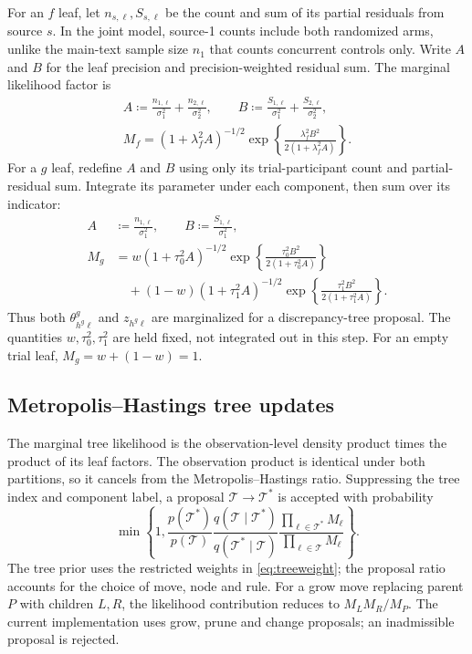\documentclass[11pt]{article}
\theoremstyle{remark}\newtheorem{remark}{Remark}[section]
\providecommand{\DIFaddtex}[1]{{\protect\color{blue} \sf #1}} %
\providecommand{\DIFaddbegin}{} %
\providecommand{\DIFaddend}{} %
\providecommand{\DIFadd}[1]{\texorpdfstring{\DIFaddtex{#1}}{#1}} %
\begin{document}
For an $f$ leaf, let $n_{s,\ell},S_{s,\ell}$ be the count and sum of its partial residuals from source $s$. \DIFaddbegin \DIFadd{In the joint model, source-1 counts include both randomized arms, unlike the main-text sample size $n_1$ that counts concurrent controls only. }\DIFaddend Write $A$ and $B$ for the leaf precision and precision-weighted residual sum. The marginal likelihood factor is
\begin{equation}\label{eq:Mf}
\begin{gathered}
A\coloneqq \frac{n_{1,\ell}}{\sigma_1^2}+\frac{n_{2,\ell}}{\sigma_2^2},\qquad
B\coloneqq \frac{S_{1,\ell}}{\sigma_{1}^2}+\frac{S_{2,\ell}}{\sigma_{2}^2},\\
M_f=(1+\lambda_f^2A)^{-1/2}
\exp\!\left\{\frac{\lambda_f^2B^2}{2(1+\lambda_f^2A)}\right\}.
\end{gathered}
\end{equation}
For a $g$ leaf, redefine $A$ and $B$ using only its  \DIFaddbegin \DIFadd{trial-participant }\DIFaddend count and partial-residual sum. Integrate its parameter under each component, then sum over its indicator:
\begin{equation}\label{eq:Mg}
\begin{aligned}
A&\coloneqq \frac{n_{1,\ell}}{\sigma_1^2},\qquad B\coloneqq \frac{S_{1,\ell}}{\sigma_1^2},\\
M_g&=w(1+\tau_0^2A)^{-1/2}
\exp\!\left\{\frac{\tau_0^2B^2}{2(1+\tau_0^2A)}\right\}\\
&\quad+(1-w)(1+\tau_1^2A)^{-1/2}
\exp\!\left\{\frac{\tau_1^2B^2}{2(1+\tau_1^2A)}\right\}.
\end{aligned}
\end{equation}
Thus both $\theta^g_{h^g\ell}$ and $z_{h^g\ell}$ are marginalized for a discrepancy-tree proposal. The quantities $w,\tau_0^2,\tau_1^2$ are held fixed, not integrated out in this step. For an empty  \DIFaddbegin \DIFadd{trial }\DIFaddend leaf, $M_g=w+(1-w)=1$.

\subsection{Metropolis--Hastings tree updates}\label{sec:A.4}
The marginal tree likelihood is the observation-level density product times the product of its leaf factors. The observation product is identical under both partitions, so it cancels from the Metropolis--Hastings ratio. Suppressing the tree index and component label, a proposal $\mathcal T\to \mathcal T^*$ is accepted with probability
\begin{equation}\label{eq:MH}
\min\left\{1,
\frac{p(\mathcal T^*)}{p(\mathcal T)}\frac{q(\mathcal T\mid \mathcal T^*)}{q(\mathcal T^*\mid \mathcal T)}
\frac{\prod_{\ell\in \mathcal T^*}M_\ell}{\prod_{\ell\in \mathcal T}M_\ell}\right\}.
\end{equation}
The tree prior  \DIFaddbegin \DIFadd{uses the restricted weights in \eqref{eq:treeweight}}\DIFaddend ; the proposal ratio accounts for the choice of move, node and rule. For a grow move replacing parent $P$ with children $L,R$, the likelihood contribution reduces to $M_LM_R/M_P$. The current implementation uses grow, prune and change proposals; an inadmissible proposal is rejected.
\end{document}
